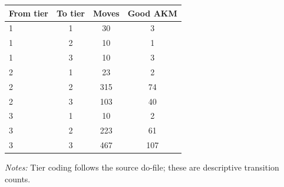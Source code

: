 \documentclass[10pt]{article}
\begin{document}
\begin{minipage}{19cm}\fontsize{10}{12}\selectfont\setlength{\tabcolsep}{4pt}\renewcommand{\arraystretch}{1.12}


\centering
{}
\begin{threeparttable}
\begin{tabular}{p{}ccc}
\toprule
From tier & To tier & Moves & Good AKM \\
\midrule
1 & 1 & 30 & 3 \\
1 & 2 & 10 & 1 \\
1 & 3 & 10 & 3 \\
2 & 1 & 23 & 2 \\
2 & 2 & 315 & 74 \\
2 & 3 & 103 & 40 \\
3 & 1 & 10 & 2 \\
3 & 2 & 223 & 61 \\
3 & 3 & 467 & 107 \\
\bottomrule
\end{tabular}
\begin{tablenotes}\fontsize{9}{11}\selectfont
\item \raggedright \fontsize{9}{11}\selectfont \textit{Notes:} Tier coding follows the source do-file; these are descriptive transition counts.
\end{tablenotes}
\end{threeparttable}

\end{minipage}
\end{document}
